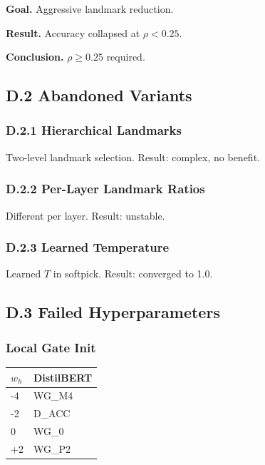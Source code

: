 \textbf{Goal.} Aggressive landmark reduction.

\textbf{Result.} Accuracy collapsed at $\rho < 0.25$.

\textbf{Conclusion.} $\rho \geq 0.25$ required.

\subsection{D.2 Abandoned Variants}

\subsubsection{D.2.1 Hierarchical Landmarks}

Two-level landmark selection. Result: complex, no benefit.

\subsubsection{D.2.2 Per-Layer Landmark Ratios}

Different   per layer. Result: unstable.

\subsubsection{D.2.3 Learned Temperature}

Learned $T$ in softpick. Result: converged to 1.0.

\subsection{D.3 Failed Hyperparameters}

\subsubsection{Local Gate Init}

\begin{table}[H]
\centering
\small
\begin{tabular}{ll}
\toprule
\textbf{$w_h$} & \textbf{DistilBERT} \\
\midrule
-4 & {{WG\_M4}} \\
-2 & {{D\_ACC}} \\
0 & {{WG\_0}} \\
+2 & {{WG\_P2}} \\
\bottomrule
\end{tabular}
\end{table}


